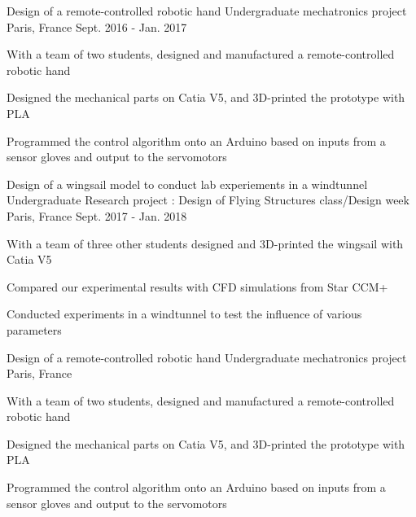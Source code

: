 \begin{cventries}
    
      \cventry
    {Design of a remote-controlled robotic hand}
    {Undergraduate mechatronics project }
    {Paris, France}
    {Sept. 2016 - Jan. 2017}
    {
      \begin{cvitems}
        \item {With a team of two students, designed and manufactured a remote-controlled robotic hand}
        \item {Designed the mechanical parts on Catia V5, and 3D-printed the prototype with PLA}
        \item {Programmed the control algorithm onto an Arduino based on inputs from a sensor gloves and output to the servomotors}
      \end{cvitems}
    }
    
     \cventry
    {Design of a wingsail model to conduct lab experiements in a windtunnel}
    {Undergraduate Research project : Design of Flying Structures class/Design week}
    {Paris, France}
    {Sept. 2017 - Jan. 2018 }
    {
      \begin{cvitems}
        \item {With a team of three other students designed and 3D-printed the wingsail with Catia V5}
        \item {Compared our experimental results with CFD simulations from Star CCM+}
        \item {Conducted experiments in a windtunnel to test the influence of various parameters}
      \end{cvitems} 
    }
    
   
  \cventry
    {Design of a remote-controlled robotic hand}
    {Undergraduate mechatronics project }
    {Paris, France}
    {
      \begin{cvitems}
        \item {With a team of two students, designed and manufactured a remote-controlled robotic hand}
        \item {Designed the mechanical parts on Catia V5, and 3D-printed the prototype with PLA}
        \item {Programmed the control algorithm onto an Arduino based on inputs from a sensor gloves and output to the servomotors}
      \end{cvitems}
    }


\end{cventries}
